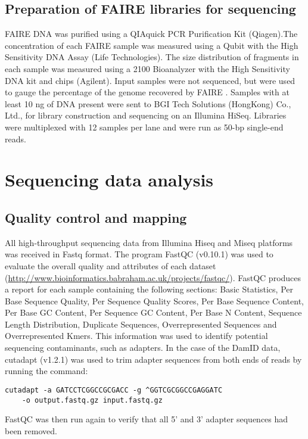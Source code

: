 \subsection{Preparation of FAIRE libraries for sequencing}
FAIRE DNA was purified using a QIAquick PCR Purification Kit (Qiagen).The concentration of each FAIRE sample was measured using a Qubit with the High Sensitivity DNA Assay (Life Technologies). The size distribution of fragments in each sample was measured using a 2100 Bioanalyzer with the High Sensitivity DNA kit and chips (Agilent). Input samples were not sequenced, but were used to gauge the percentage of the genome recovered by FAIRE \citep{simon_using_2012}. Samples with at least 10 ng of DNA present were sent to BGI Tech Solutions (HongKong) Co., Ltd., for library construction and sequencing on an Illumina HiSeq. Libraries were multiplexed with 12 samples per lane and were run as 50-bp single-end reads.

\section{Sequencing data analysis} 
\subsection{Quality control and mapping}
All high-throughput sequencing data from Illumina Hiseq and Miseq platforms was received in Fastq format. The program FastQC (v0.10.1) was used to evaluate the overall quality and attributes of each dataset (\url{http://www.bioinformatics.babraham.ac.uk/projects/fastqc/}). FastQC produces a report for each sample containing the following sections: Basic Statistics, Per Base Sequence Quality, Per Sequence Quality Scores, Per Base Sequence Content, Per Base GC Content, Per Sequence GC Content, Per Base N Content, Sequence Length Distribution, Duplicate Sequences, Overrepresented Sequences and Overrepresented Kmers. This information was used to identify potential sequencing contaminants, such as adapters. In the case of the DamID data, cutadapt (v1.2.1) was used to trim adapter sequences from both ends of reads by running the command:

\begin{lstlisting}
cutadapt -a GATCCTCGGCCGCGACC -g ^GGTCGCGGCCGAGGATC 
	-o output.fastq.gz input.fastq.gz
\end{lstlisting}

FastQC was then run again to verify that all 5' and 3' adapter sequences had been removed.\\ 

